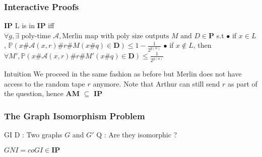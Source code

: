 \documentclass[pdf]{beamer}
\newcommand{\bb}[1]{\mathbb{#1}}
\newcommand{\A}{\mathcal{A}}
\begin{document}
\begin{frame}
\frametitle{Interactive Proofs}

\begin{block}{\textbf{IP}}
L is in \textbf{IP} iff $\forall g, \exists \text{ poly-time } \A, \text{Merlin map with poly size outputs } M \text{ and } D \in \textbf{P}$ s.t \newline
$\bullet$ if $x \in L$, $\bb{P}(x\#\A(x,r)\#r\#M(x\#q) \in \mathbf{D}) \leq  1 - \frac{1}{2^{g(n)}}$ \newline    
$\bullet$ if $x \notin L$, then $\forall M',\bb{P}(x\#\A(x,r)\#r\#M'(x\#q)\in \mathbf{D}) \leq  \frac{1}{2^{g(n)}}$
\end{block}


\begin{exampleblock}{Intuition}
We proceed in the same fashion as before but Merlin does not have access to the random tape $r$ anymore.\newline
Note that Arthur can still send $r$ as part of the question, hence \textbf{AM} $\subseteq$ \textbf{IP}
\end{exampleblock}
\end{frame}


\begin{frame}
\frametitle{The Graph Isomorphism Problem}

\begin{block}{GI}
D : Two graphs $G$ and $G'$ \newline
Q : Are they isomorphic ? \newline
\end{block}

\begin{alertblock}
$GNI = coGI \in \mathbf{IP}$
\end{alertblock}
\end{frame}
\end{document}
